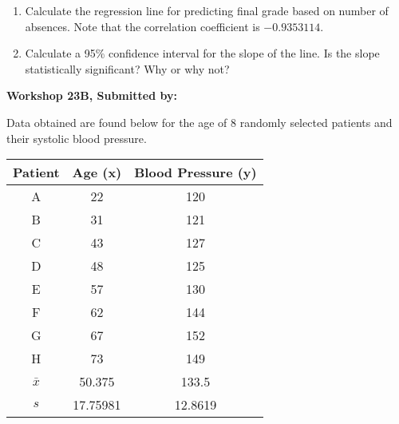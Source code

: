 \documentclass[11pt]{book}\usepackage[]{graphicx}\usepackage[]{color}
\begin{document}
\begin{exercises}
\begin{exercise}
\begin{enumerate}
  \item Calculate the regression line for predicting final grade based on number of absences.  Note that the correlation coefficient is $-0.9353114$.
  \item Calculate a 95\% confidence interval for the slope of the line.  Is the slope statistically significant?  Why or why not?
\end{enumerate}

\end{exercise}
\begin{solution}  %

\end{solution}

\clearpage

    \begin{exercise}  %

    \begin{center}
\begin{flushleft}\textbf{\large \hfill Workshop 23B, Submitted by: }\end{flushleft}

\end{center}

Data obtained are found below for the age of 8 randomly selected patients and their systolic blood pressure.

\begin{center}
\begin{tabular}{@{} ccc @{}} \hline
Patient &	Age (x)	& Blood Pressure (y) \\ \hline
A&	22&	120 \\
B&	31&	121 \\
C&	43&	127 \\
D&	48&	125 \\
E&	57&	130 \\
F&	62&	144 \\
G&	67&	152 \\
H&	73&	149 \\ \hline
$\bar{x}$ & 50.375 & 133.5 \\
$s$ & 17.75981 & 12.8619 \\ \hline
\end{tabular}
\end{center}


\end{exercise}
\end{exercises}
\end{document}
